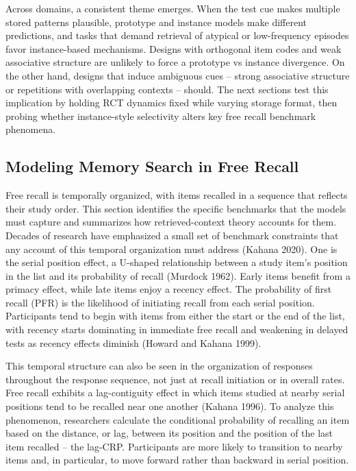\documentclass[
  letterpaper,
  11pt,
  english,
  singlespacing,
  headsepline]{MastersDoctoralThesis}
\begin{document}
Across domains, a consistent theme emerges. When the test cue makes
multiple stored patterns plausible, prototype and instance models make
different predictions, and tasks that demand retrieval of atypical or
low-frequency episodes favor instance-based mechanisms. Designs with
orthogonal item codes and weak associative structure are unlikely to
force a prototype vs instance divergence. On the other hand, designs
that induce ambiguous cues -- strong associative structure or
repetitions with overlapping contexts -- should. The next sections test
this implication by holding RCT dynamics fixed while varying storage
format, then probing whether instance-style selectivity alters key free
recall benchmark phenomena.

\subsection{Modeling Memory Search in Free
Recall}\label{modeling-memory-search-in-free-recall}

Free recall is temporally organized, with items recalled in a sequence
that reflects their study order. This section identifies the specific
benchmarks that the models must capture and summarizes how
retrieved-context theory accounts for them. Decades of research have
emphasized a small set of benchmark constraints that any account of this
temporal organization must address (Kahana 2020). One is the serial
position effect, a U-shaped relationship between a study item's position
in the list and its probability of recall (Murdock 1962). Early items
benefit from a primacy effect, while late items enjoy a recency effect.
The probability of first recall (PFR) is the likelihood of initiating
recall from each serial position. Participants tend to begin with items
from either the start or the end of the list, with recency starts
dominating in immediate free recall and weakening in delayed tests as
recency effects diminish (Howard and Kahana 1999).

This temporal structure can also be seen in the organization of
responses throughout the response sequence, not just at recall
initiation or in overall rates. Free recall exhibits a lag-contiguity
effect in which items studied at nearby serial positions tend to be
recalled near one another (Kahana 1996). To analyze this phenomenon,
researchers calculate the conditional probability of recalling an item
based on the distance, or lag, between its position and the position of
the last item recalled -- the lag-CRP. Participants are more likely to
transition to nearby items and, in particular, to move forward rather
than backward in serial position.
\end{document}
